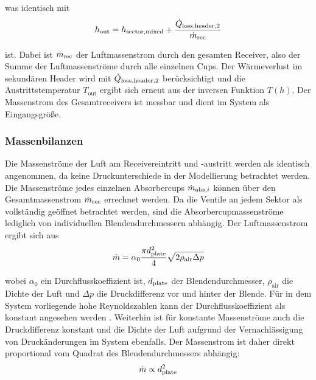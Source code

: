 \vspace*{-\baselineskip}was identisch mit
\begin{equation} \label{eq_Headerout2}
h_{\mathrm{out}} = h_{\mathrm{sector,mixed}} + \frac{\dot{Q}_{\mathrm{loss,header,2}}}{\dot{m}_{\mathrm{rec}}}
\end{equation}

\vspace*{-\baselineskip}ist.
Dabei ist $\dot{m}_{\mathrm{rec}}$ der Luftmassenstrom durch den gesamten Receiver, also der Summe der Luftmassenströme durch alle einzelnen Cups.
Der Wärmeverlust im sekundären Header wird mit $\dot{Q}_{\mathrm{loss,header,2}}$ berücksichtigt und die Austrittstemperatur $T_{\mathrm{out}}$ ergibt sich erneut aus der inversen Funktion $T(h)$.
Der Massenstrom des Gesamtreceivers ist messbar und dient im System als Eingangsgröße. \cite[S.92]{DissGall}


\subsubsection*{Massenbilanzen} \label{subsubsec_Massenbilanzen}
Die Massenströme der Luft am Receivereintritt und -austritt werden als identisch angenommen, da keine Druckunterschiede in der Modellierung betrachtet werden.
Die Massenströme jedes einzelnen Absorbercups $\dot{m}_{\mathrm{abs}, i}$ können über den Gesamtmassenstrom $\dot{m}_{\mathrm{rec}}$ errechnet werden.
Da die Ventile an jedem Sektor als vollständig geöffnet betrachtet werden, sind die Absorbercupmassenströme lediglich von individuellen Blendendurchmessern abhängig.
Der Luftmassenstrom ergibt sich aus
\begin{equation} \label{eq_MassenstromBlende}
    \dot{m} = \alpha_0 \frac{\pi d_{\mathrm{plate} }^2}{4} \sqrt{2 \rho_{\mathrm{air}} \Delta p }
\end{equation}

\vspace*{-\baselineskip}wobei $\alpha_0$ ein Durchflusskoeffizient ist, $d_{\mathrm{plate} }$ der Blendendurchmesser, $\rho_{\mathrm{air}}$ die Dichte der Luft und $\Delta p$ die Druckdifferenz vor und hinter der Blende.
Für in dem System vorliegende hohe Reynoldszahlen kann der Durchflusskoeffizient als konstant angesehen werden \cite{IdingSolarPaces}.
Weiterhin ist für konstante Massenströme auch die Druckdifferenz konstant und die Dichte der Luft aufgrund der Vernachlässigung von Druckänderungen im System ebenfalls.
Der Massenstrom ist daher direkt proportional vom Quadrat des Blendendurchmessers abhängig:
\begin{equation} \label{eq_AbhängigkeitMassenstrom}
    \dot{m} \propto d_{\mathrm{plate} }^2
\end{equation}

